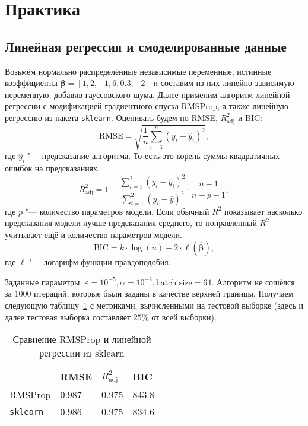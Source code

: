 \documentclass[12pt]{article}
\begin{document}
	\section{Практика}
	
	\subsection{Линейная регрессия и смоделированные данные}
	
	Возьмём нормально распределённые независимые переменные, истинные коэффициенты $\boldsymbol{\beta} = [1, 2, -1, 6, 0.3, -2]$ и составим из них линейно зависимую переменную, добавив гауссовского шума. Далее применим алгоритм линейной регрессии с модификацией градиентного спуска RMSProp, а также линейную регрессию из пакета \verb|sklearn|. Оценивать будем по RMSE, $R ^2 _{\text{adj}}$ и BIC:
	\[
	\text{RMSE} = \sqrt{\frac 1 n \sum ^n _{i = 1} (y _i - \hat y _i) ^2},
	\]
	где $\hat y _i$ "--- предсказание алгоритма. То есть это корень суммы квадратичных ошибок на предсказаниях.
	\[
	R ^2 _{\text{adj}} = 1  - \frac{\sum ^ 2 _{i = 1} (y _i - \hat y _i) ^2} {\sum ^2 _{i = 1} (y _i - \overline y) ^2} \cdot \frac{n - 1} {n - p - 1},
	\]
	где $p$ "--- количество параметров модели. Если обычный $R ^2$ показывает насколько предсказания модели лучше предсказания среднего, то поправленный $R ^2$ учитывает ещё и количество параметров модели.
 	\[
 	\text{BIC} = k \cdot \log (n) - 2 \cdot \ell (\hat{\boldsymbol{\beta}}),
 	\]
	где $\ell$ "--- логарифм функции правдоподобия.
	
 	Заданные параметры: $\varepsilon = 10 ^{-5}, \alpha = 10 ^{-2}, \text{batch size} = 64$. Алгоритм не сошёлся за $1000$ итераций, которые были заданы в качестве верхней границы. Получаем следующую таблицу~\ref{table1} с метриками, вычисленными  на тестовой выборке (здесь и далее тестовая выборка составляет $25 \%$ от всей выборки).
 	
 	\begin{table}[h]
 		\centering
 		\caption{Сравнение RMSProp и линейной регрессии из sklearn}
 		\begin{tabular}{|l|l|l|l|}
 			\hline
 			& RMSE & $R ^2 _{\text{adj}}$ & BIC \\ \hline
 			RMSProp & 0.987 & 0.975 & 843.8 \\ \hline
 			\verb|sklearn| & 0.986 & 0.975 & 834.6 \\ \hline
 		\end{tabular}
 		\label{table1}
 	\end{table}
 	
\end{document}
